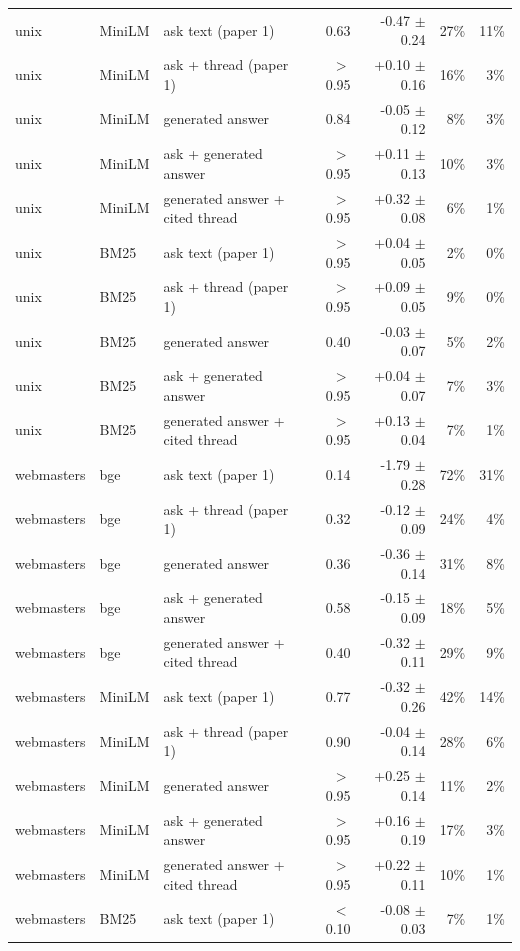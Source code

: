 \begin{tabular}{lllrrrr}
\midrule
unix & MiniLM & ask text (paper 1) & 0.63 & -0.47 $\pm$ 0.24 & 27\% & 11\% \\
unix & MiniLM & ask + thread (paper 1) & $>$0.95 & +0.10 $\pm$ 0.16 & 16\% & 3\% \\
unix & MiniLM & generated answer & 0.84 & -0.05 $\pm$ 0.12 & 8\% & 3\% \\
unix & MiniLM & ask + generated answer & $>$0.95 & +0.11 $\pm$ 0.13 & 10\% & 3\% \\
unix & MiniLM & generated answer + cited thread & $>$0.95 & +0.32 $\pm$ 0.08 & 6\% & 1\% \\
\midrule
unix & BM25 & ask text (paper 1) & $>$0.95 & +0.04 $\pm$ 0.05 & 2\% & 0\% \\
unix & BM25 & ask + thread (paper 1) & $>$0.95 & +0.09 $\pm$ 0.05 & 9\% & 0\% \\
unix & BM25 & generated answer & 0.40 & -0.03 $\pm$ 0.07 & 5\% & 2\% \\
unix & BM25 & ask + generated answer & $>$0.95 & +0.04 $\pm$ 0.07 & 7\% & 3\% \\
unix & BM25 & generated answer + cited thread & $>$0.95 & +0.13 $\pm$ 0.04 & 7\% & 1\% \\
\midrule
webmasters & bge & ask text (paper 1) & 0.14 & -1.79 $\pm$ 0.28 & 72\% & 31\% \\
webmasters & bge & ask + thread (paper 1) & 0.32 & -0.12 $\pm$ 0.09 & 24\% & 4\% \\
webmasters & bge & generated answer & 0.36 & -0.36 $\pm$ 0.14 & 31\% & 8\% \\
webmasters & bge & ask + generated answer & 0.58 & -0.15 $\pm$ 0.09 & 18\% & 5\% \\
webmasters & bge & generated answer + cited thread & 0.40 & -0.32 $\pm$ 0.11 & 29\% & 9\% \\
\midrule
webmasters & MiniLM & ask text (paper 1) & 0.77 & -0.32 $\pm$ 0.26 & 42\% & 14\% \\
webmasters & MiniLM & ask + thread (paper 1) & 0.90 & -0.04 $\pm$ 0.14 & 28\% & 6\% \\
webmasters & MiniLM & generated answer & $>$0.95 & +0.25 $\pm$ 0.14 & 11\% & 2\% \\
webmasters & MiniLM & ask + generated answer & $>$0.95 & +0.16 $\pm$ 0.19 & 17\% & 3\% \\
webmasters & MiniLM & generated answer + cited thread & $>$0.95 & +0.22 $\pm$ 0.11 & 10\% & 1\% \\
\midrule
webmasters & BM25 & ask text (paper 1) & $<$0.10 & -0.08 $\pm$ 0.03 & 7\% & 1\% \\

\end{tabular}
